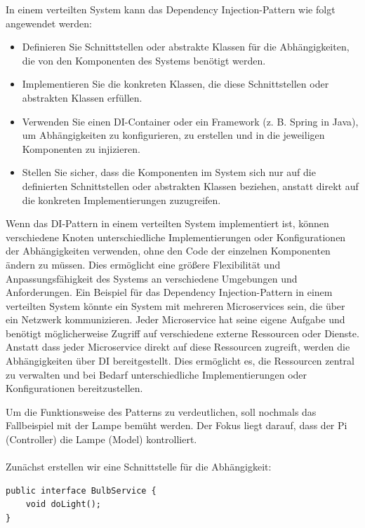In einem verteilten System kann das Dependency Injection-Pattern wie folgt angewendet werden:
\begin{itemize}
\item Definieren Sie Schnittstellen oder abstrakte Klassen für die Abhängigkeiten, die von den Komponenten des Systems benötigt werden.
\item Implementieren Sie die konkreten Klassen, die diese Schnittstellen oder abstrakten Klassen erfüllen.
\item Verwenden Sie einen DI-Container oder ein Framework (z. B. Spring in Java), um Abhängigkeiten zu konfigurieren, zu erstellen und in die jeweiligen Komponenten zu injizieren.
\item Stellen Sie sicher, dass die Komponenten im System sich nur auf die definierten Schnittstellen oder abstrakten Klassen beziehen, anstatt direkt auf die konkreten Implementierungen zuzugreifen.
\end{itemize}    
Wenn das DI-Pattern in einem verteilten System implementiert ist, können verschiedene Knoten unterschiedliche Implementierungen oder Konfigurationen der Abhängigkeiten verwenden, ohne den Code der einzelnen Komponenten ändern zu müssen. Dies ermöglicht eine größere Flexibilität und Anpassungsfähigkeit des Systems an verschiedene Umgebungen und Anforderungen. Ein Beispiel für das Dependency Injection-Pattern in einem verteilten System könnte ein System mit mehreren Microservices sein, die über ein Netzwerk kommunizieren. Jeder Microservice hat seine eigene Aufgabe und benötigt möglicherweise Zugriff auf verschiedene externe Ressourcen oder Dienste. Anstatt dass jeder Microservice direkt auf diese Ressourcen zugreift, werden die Abhängigkeiten über DI bereitgestellt. Dies ermöglicht es, die Ressourcen zentral zu verwalten und bei Bedarf unterschiedliche Implementierungen oder Konfigurationen bereitzustellen.

Um die Funktionsweise des Patterns zu verdeutlichen, soll nochmals das Fallbeispiel mit der Lampe bemüht werden. Der Fokus liegt darauf, dass der Pi (Controller) die Lampe (Model) kontrolliert. 
\\\\
Zunächst erstellen wir eine Schnittstelle für die Abhängigkeit:\\

\noindent\begin{minipage}{\textwidth}
\begin{lstlisting}[caption={Schnittstelle für die Abhängigkeit},captionpos=b,label={lst:di-interface}]
public interface BulbService {
    void doLight();
}
\end{lstlisting}
\end{minipage}

